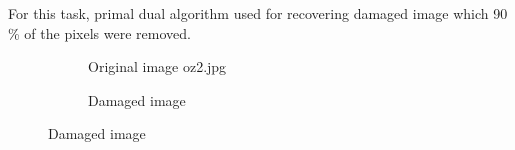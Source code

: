 \documentclass[paper=a4, fontsize=11pt]{scrartcl} %
\numberwithin{equation}{section} %
\numberwithin{figure}{section} %
\numberwithin{table}{section} %
\begin{document}
For this task, primal dual algorithm used for recovering damaged image which 90 \% of the pixels were removed.
\vspace{-5mm}
\begin{figure}[H]
	\caption{Original image and damaged image}
	\centering
	\begin{subfigure}[b]{0.45\textwidth}
		\noindent{}
	\caption{Original image oz2.jpg}
	\end{subfigure}
	\hspace{5mm}
	\begin{subfigure}[b]{0.45\textwidth}
		\noindent{}
	\caption{Damaged image}
	\end{subfigure}
\end{figure}
\end{document}
